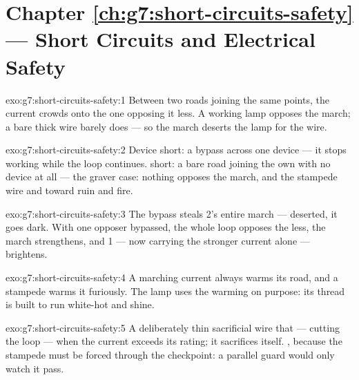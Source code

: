 \section*{Chapter \ref{ch:g7:short-circuits-safety} --- Short Circuits and Electrical Safety}

\begin{solution}{exo:g7:short-circuits-safety:1}
Between two roads joining the same points, the current crowds
onto the one opposing it less. A working lamp opposes the march;
a bare thick wire barely does --- so the march deserts the lamp
for the wire.
\end{solution}

\begin{solution}{exo:g7:short-circuits-safety:2}
Device short: a bypass across one device --- it stops working
while the loop continues.  short: a bare road joining the
 own  with no device at all --- the graver
case: nothing opposes the march, and the stampede  wire and
 toward ruin and fire.
\end{solution}

\begin{solution}{exo:g7:short-circuits-safety:3}
The bypass steals  2's entire march --- deserted, it goes
dark. With one opposer bypassed, the whole loop opposes the
 less, the march strengthens, and  1 --- now carrying
the stronger current alone --- brightens.
\end{solution}

\begin{solution}{exo:g7:short-circuits-safety:4}
A marching current always warms its road, and a stampede warms
it furiously. The lamp uses the warming on purpose: its thread
is built to run white-hot and shine.
\end{solution}

\begin{solution}{exo:g7:short-circuits-safety:5}
A deliberately thin sacrificial wire that  --- cutting the
loop --- when the current exceeds its rating; it sacrifices
itself. , because the stampede must be forced through
the checkpoint: a parallel guard would only watch it pass.
\end{solution}

